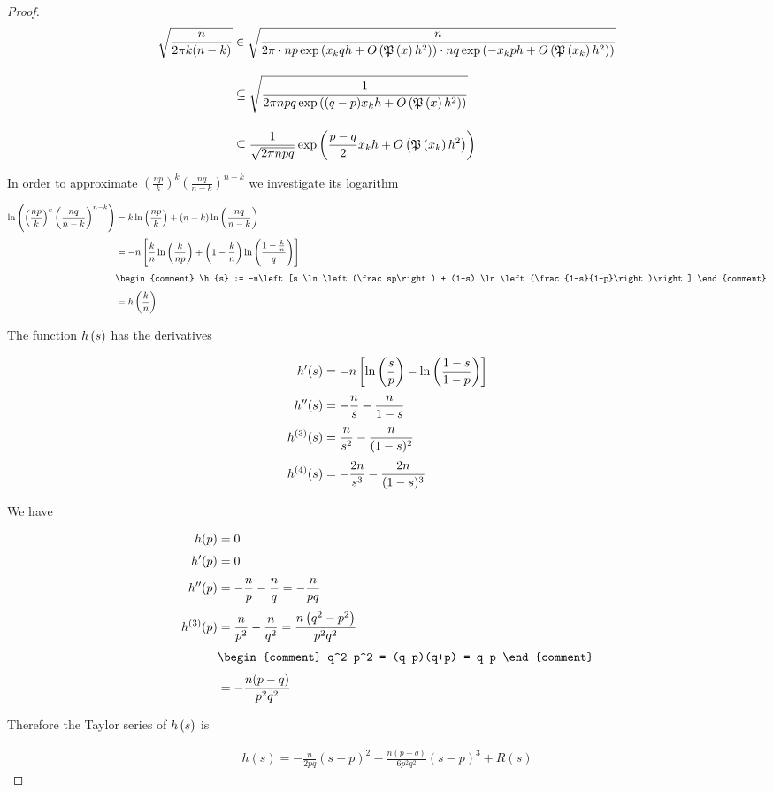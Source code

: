 \begin{proof}
  \begin{align}
    \sqrt{\frac{n}{2\pi k(n-k)}} & \in \sqrt{\frac{n}{2\pi \cdot np \fexp{\x qh +\bigo{\pol{x}h^2}} \cdot nq \fexp{-\x ph + \bigo{\pol{\x}h^2}}}} \bnl
    & \subseteq \sqrt{\frac{1}{2\pi npq \fexp{(q-p)\x h +\bigo{\pol{x}h^2}}}} \bnl
    & \subseteq \frac{1}{\sqrt{2\pi npq}} \fexp{\frac{p-q}2 \x h + \bigo{\pol{\x}h^2}}
  \end{align}

  \noindent In order to approximate $\left(\frac{np}{k}\right)^k \left(\frac{nq}{n-k}\right)^{n-k}$ we investigate its logarithm

  \begin{align}
    \ln\left(\left(\frac{np}{k}\right)^k \left(\frac{nq}{n-k}\right)^{n-k}\right) & = k \ln\left(\frac{np}{k}\right) + (n-k) \ln\left(\frac{nq}{n-k}\right) \nl
    &=-n \left[ \frac kn \ln\left(\frac{k}{np}\right) + \left(1-\frac kn\right) \ln\left(\frac{1-\frac kn}{q}\right)\right] \nl
    &
    \begin{comment}
      \h{s} := -n\left[s \ln\left(\frac sp\right) + (1-s) \ln\left(\frac{1-s}{1-p}\right)\right]
    \end{comment} \nl
    &= \h{\frac kn}
  \end{align}

  \noindent The function $h\left({s}\right)$ has the derivatives

  \begin{align}
    h'(s) &= -n\left[\ln\left(\frac sp\right) - \ln\left(\frac{1-s}{1-p}\right)\right] \nl
    h''(s) &= -\frac ns - \frac n{1-s} \nl
    h^{(3)}(s) &= \frac n{s^2} - \frac n{(1-s)^2} \nl
    h^{(4)}(s) &= -\frac {2n}{s^3} - \frac {2n}{(1-s)^3}
  \end{align}

  \noindent We have

  \begin{align}
    h(p)& = 0 \nl
    h'(p)& =0 \nl
    h''(p) & = -\frac np - \frac nq = -\frac n{pq} \nl
    h^{(3)}(p) &= \frac n{p^2}-\frac{n}{q^2} = \frac{n\left(q^2-p^2\right)}{p^2q^2} \nl
    &
    \begin{comment}
      q^2-p^2 = (q-p)(q+p) = q-p
    \end{comment} \nl
    &= -\frac{n(p-q)}{p^2q^2}
  \end{align}

  \noindent Therefore the Taylor series of $h\left({s}\right)$ is

  \begin{align}
    h(s) = -\frac{n}{2pq} (s-p)^2 - \frac{n(p-q)}{6p^2q^2} (s-p)^3 + R(s)
  \end{align}


\end{proof}
